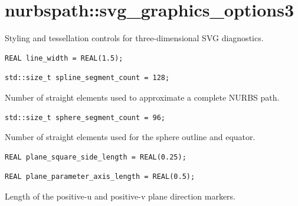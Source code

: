 \section{nurbspath::svg\_graphics\_options3}
Styling and tessellation controls for three-dimensional SVG diagnostics.
\par\noindent\begin{minipage}{\linewidth}
\begin{lstlisting}[style=apireference]
REAL line_width = REAL(1.5);
\end{lstlisting}
\end{minipage}\par\vspace{1pt}
\par\noindent\begin{minipage}{\linewidth}
\begin{lstlisting}[style=apireference]
std::size_t spline_segment_count = 128;
\end{lstlisting}
{\footnotesize Number of straight elements used to approximate a complete NURBS path.\par}
\end{minipage}\par\vspace{1pt}
\par\noindent\begin{minipage}{\linewidth}
\begin{lstlisting}[style=apireference]
std::size_t sphere_segment_count = 96;
\end{lstlisting}
{\footnotesize Number of straight elements used for the sphere outline and equator.\par}
\end{minipage}\par\vspace{1pt}
\par\noindent\begin{minipage}{\linewidth}
\begin{lstlisting}[style=apireference]
REAL plane_square_side_length = REAL(0.25);
\end{lstlisting}
\end{minipage}\par\vspace{1pt}
\par\noindent\begin{minipage}{\linewidth}
\begin{lstlisting}[style=apireference]
REAL plane_parameter_axis_length = REAL(0.5);
\end{lstlisting}
{\footnotesize Length of the positive-u and positive-v plane direction markers.\par}
\end{minipage}\par\vspace{1pt}
